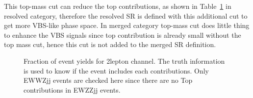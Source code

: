 This top-mass cut can reduce the top contributions, as shown in Table~\ref{fig:TruthTop2LepPurity} in resolved category, therefore the resolved SR is defined with this additional cut to get more VBS-like phase space. In merged category top-mass cut does little thing to enhance the VBS signals since top contribution is already small without the top mass cut, hence this cut is not added to the merged SR definition.
\begin{figure}[H]
    \centering
        \caption{Fraction of event yields for 2lepton channel. The truth information is used to know if the event includes each contributions. Only EWWZjj events are checked here since there are no Top contributions in EWZZjj events.}
        \label{fig:TruthTop2LepPurity}
\end{figure}

